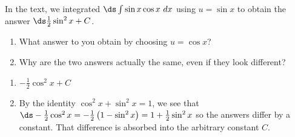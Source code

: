 {In the text, we integrated $\ds \int \sin x \cos x\ dx$ using $u=\sin x$ to obtain the answer $\ds \frac{1}{2}\sin^2 x+C$.
\begin{enumerate}
\item What answer to you obtain by choosing $u=\cos x$?
\item Why are the two answers actually the same, even if they look different?
\end{enumerate}
}
{\begin{enumerate}
\item $-\frac{1}{2}\cos^2 x+C$
\item By the identity $\cos^2 x+\sin^2 x=1$, we see that $\ds -\frac{1}{2}\cos^2 x=-\frac{1}{2}\left(1-\sin^2 x\right)=1+\frac{1}{2}\sin^2 x$ so the answers differ by a constant.  That difference is absorbed into the arbitrary constant $C$.
\end{enumerate}
}

